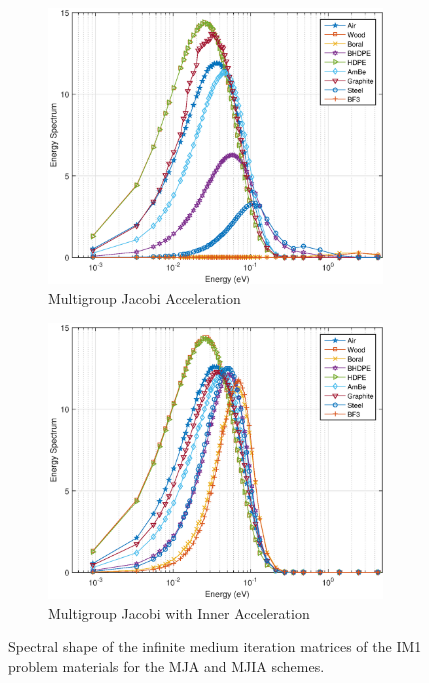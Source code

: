 \begin{figure}
\centering
	\begin{subfigure}[b]{0.775\textwidth}
		\centering
		\includegraphics[width=0.975\textwidth]{figures/sec_DSA/IM1_EC_Rich.eps}
		\caption{Multigroup Jacobi Acceleration}
	\end{subfigure}
	
	\begin{subfigure}[b]{0.775\textwidth}
		\centering
		\includegraphics[width=0.975\textwidth]{figures/sec_DSA/IM1_EC_MJIA.eps}
		\caption{Multigroup Jacobi with Inner Acceleration}
	\end{subfigure}
\caption{Spectral shape of the infinite medium iteration matrices of the IM1 problem materials for the MJA and MJIA schemes.}
\label{fig::IM1_mats_EC_MJAandMJIA}
\end{figure}

